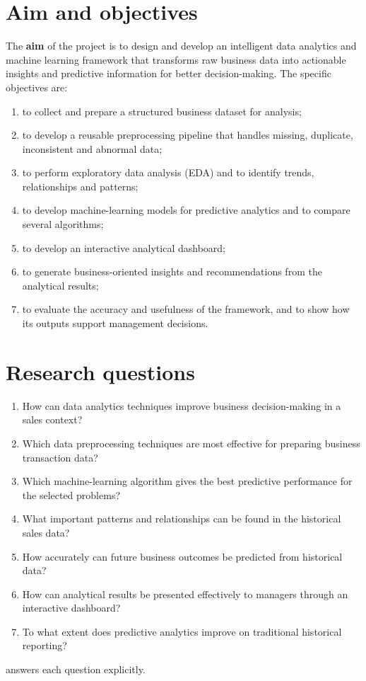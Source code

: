 \section{Aim and objectives}
The \textbf{aim} of the project is to design and develop an intelligent data analytics and machine learning
framework that transforms raw business data into actionable insights and predictive information for better
decision-making. The specific objectives are:
\begin{enumerate}[label=O\arabic*.]
  \item to collect and prepare a structured business dataset for analysis;
  \item to develop a reusable preprocessing pipeline that handles missing, duplicate, inconsistent and abnormal data;
  \item to perform exploratory data analysis (EDA) and to identify trends, relationships and patterns;
  \item to develop machine-learning models for predictive analytics and to compare several algorithms;
  \item to develop an interactive analytical dashboard;
  \item to generate business-oriented insights and recommendations from the analytical results;
  \item to evaluate the accuracy and usefulness of the framework, and to show how its outputs support management decisions.
\end{enumerate}

\section{Research questions}
\begin{enumerate}[label=RQ\arabic*.]
  \item How can data analytics techniques improve business decision-making in a sales context?
  \item Which data preprocessing techniques are most effective for preparing business transaction data?
  \item Which machine-learning algorithm gives the best predictive performance for the selected problems?
  \item What important patterns and relationships can be found in the historical sales data?
  \item How accurately can future business outcomes be predicted from historical data?
  \item How can analytical results be presented effectively to managers through an interactive dashboard?
  \item To what extent does predictive analytics improve on traditional historical reporting?
\end{enumerate}
 answers each question explicitly.

